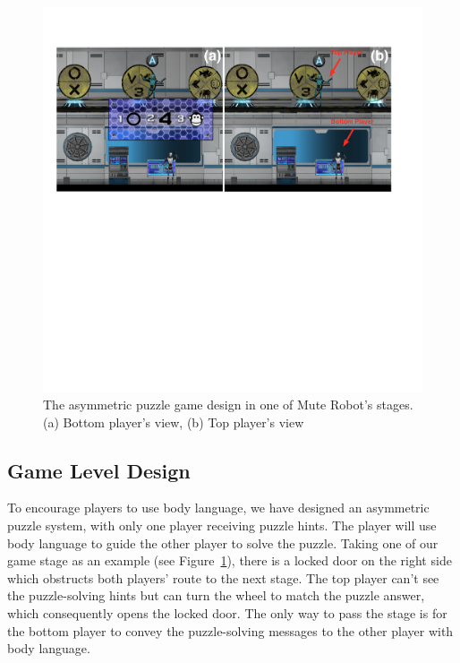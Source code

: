 \begin{figure}[!h]
\centering
\includegraphics[width=1.0\columnwidth]{Figures/GD_F2.pdf}
\caption{The asymmetric puzzle game design in one of Mute Robot's stages. (a) Bottom player's view, (b) Top player's view}
\label{fig:GD_F2}
\end{figure}


\subsection{Game Level Design}


To encourage players to use body language, we have designed an asymmetric puzzle system, with only one player receiving puzzle hints. The player will use body language to guide the other player to solve the puzzle. Taking one of our game stage as an example (see Figure~\ref{fig:GD_F2}), there is a locked door on the right side which obstructs both players' route to the next stage. The top player can't see the puzzle-solving hints but can turn the wheel to match the puzzle answer, which consequently opens the locked door. The only way to pass the stage is for the bottom player to convey the puzzle-solving messages to the other player with body language.


